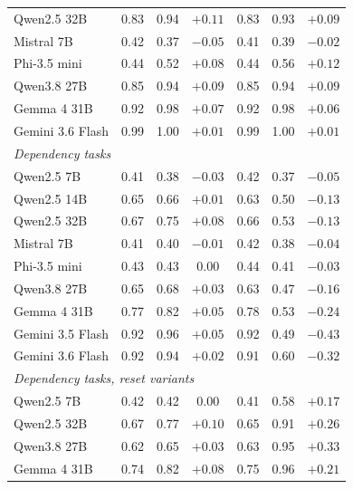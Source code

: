\begin{tabular}{lcccccc}
Qwen2.5 32B & 0.83 & 0.94 & $+0.11$ & 0.83 & 0.93 & $+0.09$ \\
Mistral 7B & 0.42 & 0.37 & $-0.05$ & 0.41 & 0.39 & $-0.02$ \\
Phi-3.5 mini & 0.44 & 0.52 & $+0.08$ & 0.44 & 0.56 & $+0.12$ \\
Qwen3.8 27B & 0.85 & 0.94 & $+0.09$ & 0.85 & 0.94 & $+0.09$ \\
Gemma 4 31B & 0.92 & 0.98 & $+0.07$ & 0.92 & 0.98 & $+0.06$ \\
Gemini 3.6 Flash & 0.99 & 1.00 & $+0.01$ & 0.99 & 1.00 & $+0.01$ \\
\multicolumn{7}{l}{\emph{Dependency tasks}} \\
Qwen2.5 7B & 0.41 & 0.38 & $-0.03$ & 0.42 & 0.37 & $-0.05$ \\
Qwen2.5 14B & 0.65 & 0.66 & $+0.01$ & 0.63 & 0.50 & $-0.13$ \\
Qwen2.5 32B & 0.67 & 0.75 & $+0.08$ & 0.66 & 0.53 & $-0.13$ \\
Mistral 7B & 0.41 & 0.40 & $-0.01$ & 0.42 & 0.38 & $-0.04$ \\
Phi-3.5 mini & 0.43 & 0.43 & $0.00$ & 0.44 & 0.41 & $-0.03$ \\
Qwen3.8 27B & 0.65 & 0.68 & $+0.03$ & 0.63 & 0.47 & $-0.16$ \\
Gemma 4 31B & 0.77 & 0.82 & $+0.05$ & 0.78 & 0.53 & $\mathbf{-0.24}$ \\
Gemini 3.5 Flash & 0.92 & 0.96 & $+0.05$ & 0.92 & 0.49 & $\mathbf{-0.43}$ \\
Gemini 3.6 Flash & 0.92 & 0.94 & $+0.02$ & 0.91 & 0.60 & $\mathbf{-0.32}$ \\
\multicolumn{7}{l}{\emph{Dependency tasks, reset variants}} \\
Qwen2.5 7B & 0.42 & 0.42 & $0.00$ & 0.41 & 0.58 & $+0.17$ \\
Qwen2.5 32B & 0.67 & 0.77 & $+0.10$ & 0.65 & 0.91 & $\mathbf{+0.26}$ \\
Qwen3.8 27B & 0.62 & 0.65 & $+0.03$ & 0.63 & 0.95 & $\mathbf{+0.33}$ \\
Gemma 4 31B & 0.74 & 0.82 & $+0.08$ & 0.75 & 0.96 & $\mathbf{+0.21}$ \\
\bottomrule
\end{tabular}

